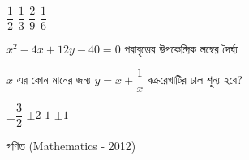 \documentclass[addpoints]{exam}
\begin{document}
\begin{questions}
\begin{oneparchoices}
\choice $ \dfrac{1}{2} $
\choice $ \dfrac{1}{3} $
\choice $ \dfrac{2}{9} $
\choice $ \dfrac{1}{6} $
\end{oneparchoices}

\question  $ x^{2}- 4x+12y-40 = 0 $ পরাবৃত্তের উপকেন্দ্রিক লম্বের দৈর্ঘ্য 

\begin{oneparchoices}
\end{oneparchoices}

\question  $ x $ এর কোন মানের জন্য $ y = x + \dfrac{1}{x} $ বক্ররেখাটির ঢাল শূন্য হবে?

\begin{oneparchoices}
\choice $ \pm \dfrac{3}{2} $
\choice $ \pm 2 $
\choice $ 1 $
\choice  $ \pm 1 $
\end{oneparchoices}

\end{questions}
\begin{LARGE}
\begin{center}
গণিত (Mathematics - 2012)
\end{center}
\end{LARGE}
\end{document}
